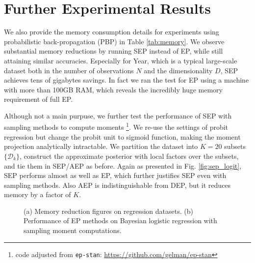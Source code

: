 \documentclass{article} %
\begin{document}
\section{Further Experimental Results}

We also provide the memory consumption details for experiments using probabilistic back-propagation (PBP) in Table \ref{tab:memory}. We observe substantial memory reductions by running SEP instead of EP, while still attaining similar accuracies. Especially for Year, which is a typical large-scale dataset both in the number of observations $N$ and the dimensionality $D$, SEP achieves tens of gigabytes savings. In fact we ran the test for EP using a machine with more than 100GB RAM, which reveals the incredibly huge memory requirement of full EP. 

Although not a main purpuse, we further test the performance of SEP with sampling methods to compute moments \footnote{code adjusted from \texttt{ep-stan}: \url{https://github.com/gelman/ep-stan}}. We re-use the settings of probit regression but change the probit unit to sigmoid function, making the moment projection analytically intractable. We partition the dataset into $K = 20$ subsets $\{\mathcal{D}_k\}$, construct the approximate posterior with local factors over the subsets, and tie them in SEP/AEP as before. Again as presented in Fig. \ref{fig:sep_logit}, SEP performs almost as well as EP, which further justifies SEP even with sampling methods. Also AEP is indistinguishable from DEP, but it reduces memory by a factor of $K$.

\begin{figure}
\centering
%
\begin{minipage}[!t]{0.5\linewidth}
\end{minipage}
%
\hspace{0.3in}
%
\begin{minipage}[!t]{0.35\linewidth}
\def\svgwidth{0.7\linewidth}
\subfigure[\label{fig:sep_logit}]{

}
\end{minipage}
%
\caption{(a) Memory reduction figures on regression datasets. (b) Performance of EP methods on Bayesian logistic regression with sampling moment computations.}
\end{figure}
\end{document}
